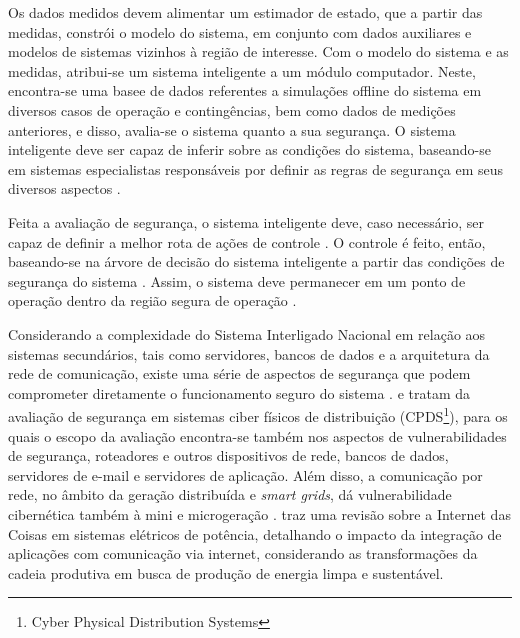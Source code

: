 \documentclass[12pt,oneside,a4paper,chapter=TITLE,section=TITLE,sumario=tradicional,english,brazil]{abntex2}
\begin{document}
\par 
Os dados medidos devem alimentar um estimador de estado, que a partir das medidas, constrói o modelo do sistema, em conjunto com dados auxiliares e modelos de sistemas vizinhos à região de interesse. Com o modelo do sistema e as medidas, atribui-se um sistema inteligente a um módulo computador. Neste, encontra-se uma basee de dados referentes a simulações offline do sistema em diversos casos de operação e contingências, bem como dados de medições anteriores, e disso, avalia-se o sistema quanto a sua segurança. O sistema inteligente deve ser capaz de inferir sobre as condições do sistema, baseando-se em sistemas especialistas responsáveis por definir as regras de segurança em seus diversos aspectos \cite{kundur2004}.\par 
Feita a avaliação de segurança, o sistema inteligente deve, caso necessário, ser capaz de definir a melhor rota de ações de controle \cite{kundur2004}. O controle é feito, então, baseando-se na árvore de decisão do sistema inteligente a partir das condições de segurança do sistema \cite{kundur2004}. Assim, o sistema deve permanecer em um ponto de operação dentro da região segura de operação \cite{kundur2004}.\par 

Considerando a complexidade do Sistema Interligado Nacional em relação aos sistemas secundários, tais como servidores, bancos de dados e a arquitetura da rede de comunicação, existe uma série de aspectos de segurança que podem comprometer diretamente o funcionamento seguro do sistema \cite{Xu2020}. \textcite{Yohanandhan2020} e \textcite{lin2020} tratam da avaliação de segurança em sistemas ciber físicos de distribuição (CPDS\footnote{Cyber Physical Distribution Systems}), para os quais o escopo da avaliação encontra-se também nos aspectos de vulnerabilidades de segurança, roteadores e outros dispositivos de rede, bancos de dados,  servidores de e-mail e servidores de aplicação. Além disso, a comunicação por rede, no âmbito da geração distribuída e \textit{smart grids}, dá vulnerabilidade cibernética também à mini e microgeração \cite{taha2018}. \textcite{bedi2018} traz uma revisão sobre a Internet das Coisas em sistemas elétricos de potência, detalhando o impacto da integração de aplicações com comunicação via internet, considerando as transformações da cadeia produtiva em busca de produção de energia limpa e sustentável.\par 
\end{document}
